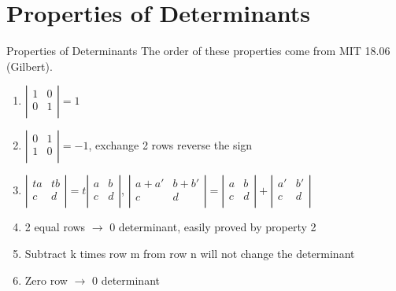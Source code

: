 \documentclass{beamer}
\begin{document}
\section{Properties of Determinants}
\begin{frame}{Properties of Determinants}
The order of these properties come from MIT 18.06 (Gilbert).
\begin{enumerate}
    \item $\left| \begin{matrix}
        1&		0\\
        0&		1\\
    \end{matrix} \right|=1$
    \item $\left| \begin{matrix}
        0&		1\\
        1&		0\\
    \end{matrix} \right|=-1$, exchange 2 rows reverse the sign
    \item $\left| \begin{matrix}
        ta&		tb\\
        c&		d\\
    \end{matrix} \right|=t\left| \begin{matrix}
        a&		b\\
        c&		d\\
    \end{matrix} \right|$, $\left| \begin{matrix}
        a+a'&		b+b'\\
        c&		d\\
    \end{matrix} \right|=\left| \begin{matrix}
        a&		b\\
        c&		d\\
    \end{matrix} \right|+\left| \begin{matrix}
        a'&		b'\\
        c&		d\\
    \end{matrix} \right|$
    \item 2 equal rows $\rightarrow$ 0 determinant, easily proved by property 2
    \item Subtract k times row m from row n will not change the determinant
    \item Zero row $\rightarrow$ 0 determinant
\end{enumerate}
\end{frame}
\end{document}
